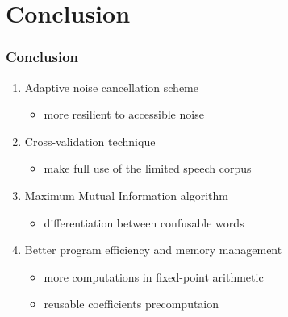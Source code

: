 \section{Conclusion}

\begin{frame}
\frametitle{Conclusion}

\begin{enumerate}
	\item Adaptive noise cancellation scheme
	\begin{itemize}
		\item more resilient to accessible noise
	\end{itemize}
	\item Cross-validation technique
	\begin{itemize}
		\item make full use of the limited speech corpus
	\end{itemize}
	\item Maximum Mutual Information algorithm
	\begin{itemize}
		\item differentiation between confusable words
	\end{itemize}
	\item Better program efficiency and memory management
	\begin{itemize}
		\item more computations in fixed-point arithmetic
		\item reusable coefficients precomputaion
	\end{itemize}
\end{enumerate}
\end{frame}
